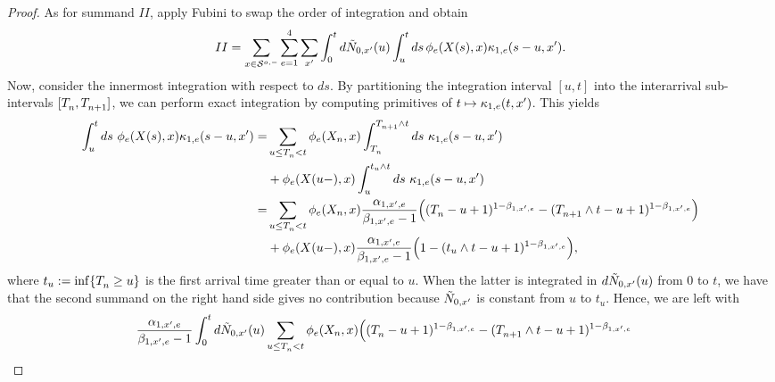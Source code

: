 \documentclass[10pt]{article}
\begin{document}
\begin{proof}
As for summand $II$, apply Fubini to swap the order of integration and obtain 
\begin{equation*}
 II =
 \sum_{x\in\weakDeflSpace}\sum_{e=1}^{4}\sum_{\xone}
 \intzerot d\hybridHawkes_{0,\xone}(u) 
 \int_{u}^{t}ds \, \transProb_{e}(\stateVariable(s),x)\hawkesKernel_{1,e}(s-u,\xone) .
\end{equation*}
Now, consider the innermost integration with respect to $ds$. By partitioning the integration interval $[u,t]$ into the interarrival sub-intervals $[\arrivalTimes[]_{n}, \arrivalTimes[]_{n+1}]$, we can perform exact integration by computing primitives of $t\mapsto\hawkesKernel_{1,e}(t,\xone)$. This yields
\begin{equation*}
\begin{split}
 \int_{u}^{t} ds \, \, \transProb_{e} (\stateVariable(s),x) \hawkesKernel_{1,e}(s-u,\xone)
 = &
 \sum_{u\leq \arrivalTimes[]_n < t} \transProb_{e} (\stateVariable_n, x)
 \int_{\arrivalTimes[]_n}^{\arrivalTimes[]_{n+1}\wedge t} ds \,\, \hawkesKernel_{1,e}(s-u,\xone)
 \\
 &+
 \transProb_{e} (\stateVariable(u-), x)
 \int_{u}^{t_u \wedge t} ds \,\, \hawkesKernel_{1,e}(s-u,\xone)
 \\
 =&
 \sum_{u\leq \arrivalTimes[]_n < t} \transProb_{e}(\stateVariable_n, x) \frac{\impCoef_{1,\xone,e}}{\decCoef_{1,\xone,e} - 1}
 \Big(
 (\arrivalTimes[]_n - u +1)^{1-\decCoef_{1,\xone,e}}
  - (\arrivalTimes[]_{n+1}\wedge t - u +1)^{1-\decCoef_{1,\xone,e}}  
 \Big)
 \\
 &+
 \transProb_{e}(\stateVariable(u-), x) \frac{\impCoef_{1,\xone,e}}{\decCoef_{1,\xone,e} - 1}
 \Big(
 1  - (t_u\wedge t - u +1)^{1-\decCoef_{1,\xone,e}}
 \Big),
 \end{split}
\end{equation*}
where $t_u:= \inf\lbrace \arrivalTimes[]_n \geq u\rbrace$ is the first arrival time greater than or equal to $u$. When the latter is integrated in $d\hybridHawkes_{0,\xone}(u)$ from $0$ to $t$, we have that the second summand on the right hand side gives no contribution because $\hybridHawkes_{0,\xone}$ is constant from $u$ to $t_u$. Hence, we are left with 
\begin{equation*}
\begin{split}
 \frac{\impCoef_{1,\xone,e}}{\decCoef_{1,\xone,e} - 1}
 \intzerot d\hybridHawkes_{0,\xone}(u)
 &
 \sum_{u\leq \arrivalTimes[]_n < t} \transProb_{e}(\stateVariable_n, x) 
 \Big(
 (\arrivalTimes[]_n - u +1)^{1-\decCoef_{1,\xone,e}}
  - (\arrivalTimes[]_{n+1}\wedge t - u +1)^{1-\decCoef_{1,\xone,e}}  

\end{split}
\end{equation*}
\end{proof}
\end{document}
